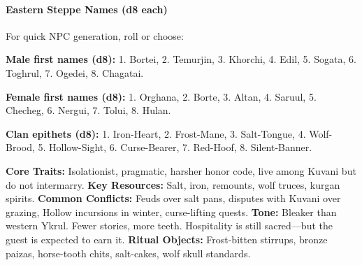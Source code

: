 \paragraph{Eastern Steppe Names (d8 each)}
For quick NPC generation, roll or choose:

\textbf{Male first names (d8):}  
1. Bortei, 2. Temurjin, 3. Khorchi, 4. Edil, 5. Sogata, 6. Toghrul, 7. Ogedei, 8. Chagatai.

\textbf{Female first names (d8):}  
1. Orghana, 2. Borte, 3. Altan, 4. Saruul, 5. Checheg, 6. Nergui, 7. Tolui, 8. Hulan.

\textbf{Clan epithets (d8):}  
1. Iron-Heart, 2. Frost-Mane, 3. Salt-Tongue, 4. Wolf-Brood, 5. Hollow-Sight, 6. Curse-Bearer, 7. Red-Hoof, 8. Silent-Banner.

\begin{tcolorbox}[colback=black!3,colframe=black!40!white,title={Eastern Ykrul at a Glance},breakable]
\textbf{Core Traits:} Isolationist, pragmatic, harsher honor code, live among Kuvani but do not intermarry.  
\textbf{Key Resources:} Salt, iron, remounts, wolf truces, kurgan spirits.  
\textbf{Common Conflicts:} Feuds over salt pans, disputes with Kuvani over grazing, Hollow incursions in winter, curse-lifting quests.  
\textbf{Tone:} Bleaker than western Ykrul. Fewer stories, more teeth. Hospitality is still sacred---but the guest is expected to earn it.  
\textbf{Ritual Objects:} Frost-bitten stirrups, bronze paizas, horse-tooth chits, salt-cakes, wolf skull standards.
\end{tcolorbox}

